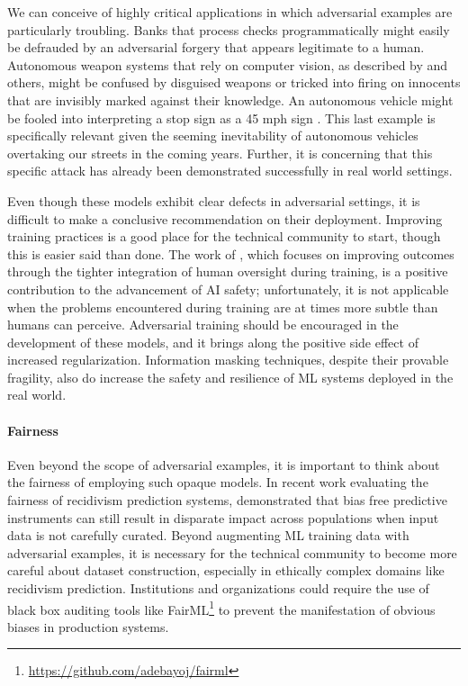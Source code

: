 \documentclass[]{article}
\begin{document}
We can conceive of highly critical applications in which adversarial examples are particularly troubling. Banks that process checks programmatically might easily be defrauded by an adversarial forgery that appears legitimate to a human. Autonomous weapon systems that rely on computer vision, as described by \citet{arkin2010case} and others, might be confused by disguised weapons or tricked into firing on innocents that are invisibly marked against their knowledge. An autonomous vehicle might be fooled into interpreting a stop sign as a 45 mph sign \citep{DBLP:journals/corr/EvtimovEFKLPRS17}. This last example is specifically relevant given the seeming inevitability of autonomous vehicles overtaking our streets in the coming years. Further, it is concerning that this specific attack has already been demonstrated successfully in real world settings.

Even though these models exhibit clear defects in adversarial settings, it is difficult to make a conclusive recommendation on their deployment. Improving training practices is a good place for the technical community to start, though this is easier said than done. The work of \citet{leike2017ai}, which focuses on improving outcomes through the tighter integration of human oversight during training, is a positive contribution to the advancement of AI safety; unfortunately, it is not applicable when the problems encountered during training are at times more subtle than humans can perceive. Adversarial training should be encouraged in the development of these models, and it brings along the positive side effect of increased regularization. Information masking techniques, despite their provable fragility, also do increase the safety and resilience of ML systems deployed in the real world.

\paragraph{Fairness} Even beyond the scope of adversarial examples, it is important to think about the fairness of employing such opaque models. In recent work evaluating the fairness of recidivism prediction systems, \citet{chouldechova2016} demonstrated that bias free predictive instruments can still result in disparate impact across populations when input data is not carefully curated. Beyond augmenting ML training data with adversarial examples, it is necessary for the technical community to become more careful about dataset construction, especially in ethically complex domains like recidivism prediction.
Institutions and organizations could require the use of black box auditing tools like FairML\footnote{\url{https://github.com/adebayoj/fairml}} to prevent the manifestation of obvious biases in production systems.
\end{document}
